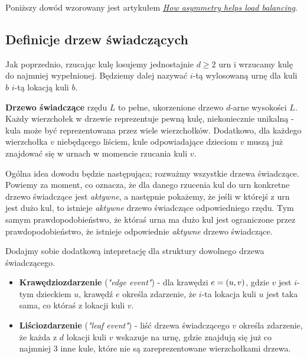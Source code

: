 Poniższy dowód wzorowany jest artykułem \href{https://dl.acm.org/doi/10.1145/792538.792546}{\textit{How asymmetry helps load balancing}}.

\subsection*{Definicje drzew świadczących}

Jak poprzednio, rzucając kulę losujemy jednostajnie \(d \geq 2\) urn i wrzucamy kulę do najmniej wypełnionej. Będziemy dalej nazywać \(i\)-tą wylosowaną urnę dla kuli \(b\) \(i\)-tą lokacją kuli \(b\).

\begin{definition}
	\textbf{Drzewo świadczące} rzędu \(L\) to pełne, ukorzenione drzewo \(d\)-arne wysokości \(L\).
	Każdy wierzchołek w drzewie reprezentuje pewną kulę, niekoniecznie unikalną - kula może być reprezentowana przez wiele wierzchołków.
	Dodatkowo, dla każdego wierzchołka \(v\) niebędącego liściem, kule odpowiadające dzieciom \(v\) muszą już znajdować się w urnach w momencie rzucania kuli \(v\).
\end{definition}

Ogólna idea dowodu będzie następująca; rozważmy wszystkie drzewa świadczące.
Powiemy za moment, co oznacza, że dla danego rzucenia kul do urn konkretne drzewo świadczące jest \textit{aktywne}, a następnie pokażemy, że jeśli w którejś z urn jest dużo kul, to istnieje \textit{aktywne} drzewo świadczące odpowiedniego rzędu.
Tym samym prawdopodobieństwo, że któraś urna ma dużo kul jest ograniczone przez prawdopodobieństwo, że istnieje odpowiednie \textit{aktywne} drzewo świadczące.

\begin{definition}
	Dodajmy sobie dodatkową intepretację dla struktury dowolnego drzewa świadczącego.

	\begin{itemize}
		\item \textbf{Krawędziozdarzenie} (\textit{"edge event"}) - dla krawędzi \(e = \left(u, v\right)\), gdzie \(v\) jest \(i\)-tym dzieckiem \(u\),
		      krawędź \(e\) określa zdarzenie, że \(i\)-ta lokacja kuli \(u\) jest taka sama, co któraś z lokacji kuli \(v\).
		\item \textbf{Liściozdarzenie} (\textit{"leaf event"}) - liść drzewa świadczącego \(v\) określa zdarzenie, że każda z \(d\) lokacji kuli \(v\) wskazuje na urnę, gdzie znajdują się już co najmniej 3 inne kule, które nie są zareprezentowane wierzchołkami drzewa.
	\end{itemize}
\end{definition}

